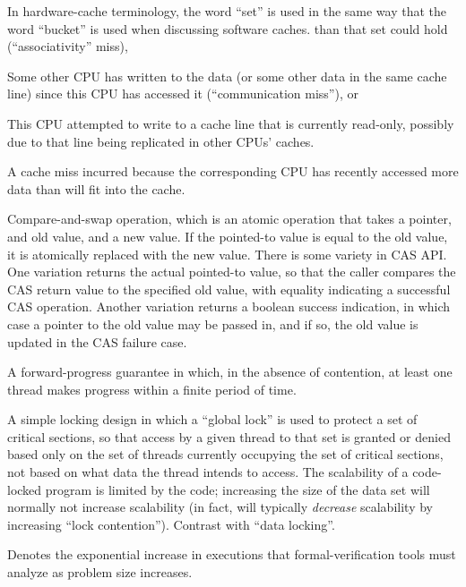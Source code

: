 \begin{description}
\begin{enumerate*}[(1)]
{		In hardware-cache terminology, the word ``set''
		is used in the same way that the word ``bucket''
		is used when discussing software caches.}
	than that set could hold (``associativity'' miss),
	\item Some other CPU has written to the data (or some other
	data in the same cache line) since this CPU has accessed it
	(``communication miss''), or
	\item This CPU attempted to write to a cache line that is
	currently read-only, possibly due to that line being replicated
	in other CPUs' caches.
	\end{enumerate*}
\item[\IXGalth{Capacity Miss}{capacity}{cache miss}:]
	A cache miss incurred because the corresponding CPU has recently
	accessed more data than will fit into the cache.
\item[CAS:]
	Compare-and-swap operation, which is an atomic operation that
	takes a pointer, and old value, and a new value.
	If the pointed-to value is equal to the old value, it is atomically
	replaced with the new value.
	There is some variety in CAS API\@.
	One variation returns the actual pointed-to value, so that the
	caller compares the CAS return value to the specified old value,
	with equality indicating a successful CAS operation.
	Another variation returns a boolean success indication, in which
	case a pointer to the old value may be passed in, and if so,
	the old value is updated in the CAS failure case.
\item[\IXG{Clash Free}:]
	A forward-progress guarantee in which, in the absence of
	contention, at least one thread makes progress within a finite
	period of time.
\item[\IXGalth{Code Locking}{code}{locking}:]
	A simple locking design in which a ``global lock'' is used to protect
	a set of critical sections, so that access by a given thread
	to that set is
	granted or denied based only on the set of threads currently
	occupying the set of critical sections, not based on what
	data the thread intends to access.
	The scalability of a code-locked program is limited by the code;
	increasing the size of the data set will normally not increase
	scalability (in fact, will typically \emph{decrease} scalability
	by increasing ``lock contention'').
	Contrast with ``data locking''.
\item[\IXG{Combinatorial Explosion}:]
	Denotes the exponential increase in executions that
	formal-verification tools must analyze as problem size increases.
\item[\IXG{Combinatorial Implosion}:]

\end{description}
